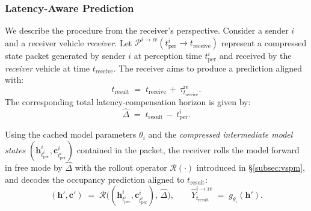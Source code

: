 \subsubsection{Latency-Aware Prediction}
We describe the procedure from the receiver's perspective. Consider a sender $i$ and a receiver vehicle \emph{receiver}. Let $\mathcal{P}^{i \rightarrow \text{re}}(t^{i}_{\text{per}}\!\to\!t_{\text{receive}})$ represent a compressed state packet generated by sender $i$ at perception time $t^{i}_{\text{per}}$ and received by the \emph{receiver} vehicle at time $t_{\text{receive}}$. The receiver aims to produce a prediction aligned with:
\[
t_{\text{result}} \;=\; t_{\text{receive}} \,+\, \tau^{\text{re}}_{t_{\text{receive}}}.
\]
The corresponding total latency-compensation horizon is given by:
\[
\widehat{\Delta} \;=\; t_{\text{result}} \,-\, t^{i}_{\text{per}}.
\]

Using the cached model parameters $\theta_i$ and the \emph{compressed intermediate model states} $(\mathbf{h}^i_{t^{i}_{\text{per}}}, \mathbf{c}^i_{t^{i}_{\text{per}}})$ contained in the packet, the receiver rolls the model forward in free mode by $\widehat{\Delta}$ with the rollout operator $\mathcal{R}(\cdot)$ introduced in \S\ref{subsec:vspm}, and decodes the occupancy prediction aligned to $t_{\text{result}}$:
\[
(\mathbf{h}',\mathbf{c}') \;=\; \mathcal{R}\!\Big((\mathbf{h}^i_{t^{i}_{\text{per}}}, \mathbf{c}^i_{t^{i}_{\text{per}}}),\,\widehat{\Delta}\Big), 
\qquad
\widehat{Y}^{i\rightarrow \text{re}}_{t_{\text{result}}} \;=\; g_{\theta_i}(\mathbf{h}').
\]


